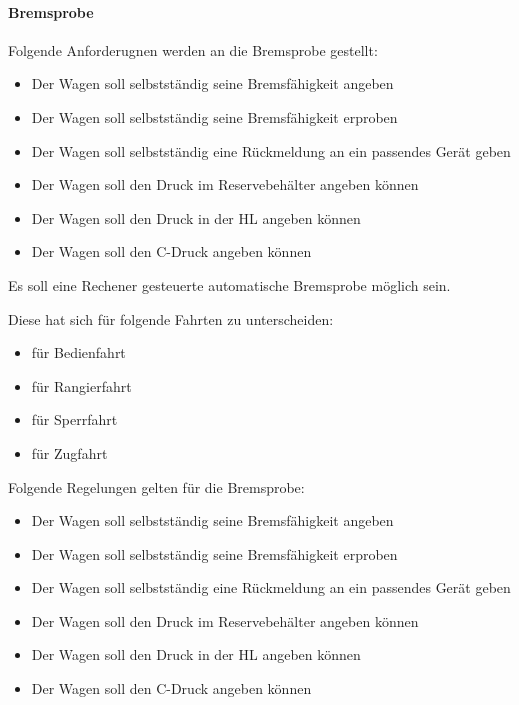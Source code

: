\paragraph{Bremsprobe}
\begin{feat}
Folgende Anforderugnen werden an die Bremsprobe gestellt:
\begin{itemize}
    \item Der Wagen soll selbstständig seine Bremsfähigkeit angeben
    \item Der Wagen soll selbstständig seine Bremsfähigkeit erproben
    \item Der Wagen soll selbstständig eine Rückmeldung an ein passendes Gerät geben
    \item Der Wagen soll den Druck im Reservebehälter angeben können
    \item Der Wagen soll den Druck in der HL angeben können
    \item Der Wagen soll den C-Druck angeben können
\end{itemize}
\end{feat}
\begin{feat}
Es soll eine Rechener gesteuerte automatische Bremsprobe möglich sein.
\end{feat}
\begin{rem} Diese hat sich für folgende Fahrten zu unterscheiden:
\begin{itemize}
    \item für Bedienfahrt
    \item für Rangierfahrt
    \item für Sperrfahrt
    \item für Zugfahrt
\end{itemize}
\end{rem}
\begin{rem}
Folgende Regelungen gelten für die Bremsprobe:
\begin{itemize}
    \item Der Wagen soll selbstständig seine Bremsfähigkeit angeben
    \item Der Wagen soll selbstständig seine Bremsfähigkeit erproben
    \item Der Wagen soll selbstständig eine Rückmeldung an ein passendes Gerät geben
    \item Der Wagen soll den Druck im Reservebehälter angeben können
    \item Der Wagen soll den Druck in der HL angeben können
    \item Der Wagen soll den C-Druck angeben können
\end{itemize}
\end{rem}

